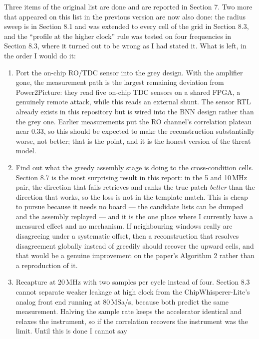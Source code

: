 \documentclass[11pt,a4paper]{article}
\begin{document}
Three items of the original list are done and are reported in Section 7. Two more that
appeared on this list in the previous version are now also done: the radius sweep is in
Section 8.1 and was extended to every cell of the grid in Section 8.3, and the
``profile at the higher clock'' rule was tested on four frequencies in Section 8.3, where
it turned out to be wrong as I had stated it. What is left, in the order I would do it:

\begin{enumerate}
\item Port the on-chip RO/TDC sensor into the grey design. With the amplifier gone, the
      measurement path is the largest remaining deviation from Power2Picture: they read
      five on-chip TDC sensors on a shared FPGA, a genuinely remote attack, while this
      reads an external shunt. The sensor RTL already exists in this repository but is
      wired into the BNN design rather than the grey one. Earlier measurements put the
      RO channel's correlation plateau near $0.33$, so this should be expected to make
      the reconstruction substantially worse, not better; that is the point, and it is
      the honest version of the threat model.
\item Find out what the greedy assembly stage is doing to the cross-condition cells.
      Section 8.7 is the most surprising result in this report: in the 5 and 10\,MHz pair,
      the direction that fails retrieves and ranks the true patch \emph{better} than the
      direction that works, so the loss is not in the template match. This is cheap to
      pursue because it needs no board --- the candidate lists can be dumped and the
      assembly replayed --- and it is the one place where I currently have a measured
      effect and no mechanism. If neighbouring windows really are disagreeing under a
      systematic offset, then a reconstruction that resolves disagreement globally instead
      of greedily should recover the upward cells, and that would be a genuine improvement
      on the paper's Algorithm 2 rather than a reproduction of it.
\item Recapture at 20\,MHz with two samples per cycle instead of four. Section 8.3 cannot
      separate weaker leakage at high clock from the ChipWhisperer-Lite's analog front end
      running at 80\,MSa/s, because both predict the same measurement. Halving the sample
      rate keeps the accelerator identical and relaxes the instrument, so if the
      correlation recovers the instrument was the limit. Until this is done I cannot say

\end{enumerate}
\end{document}
